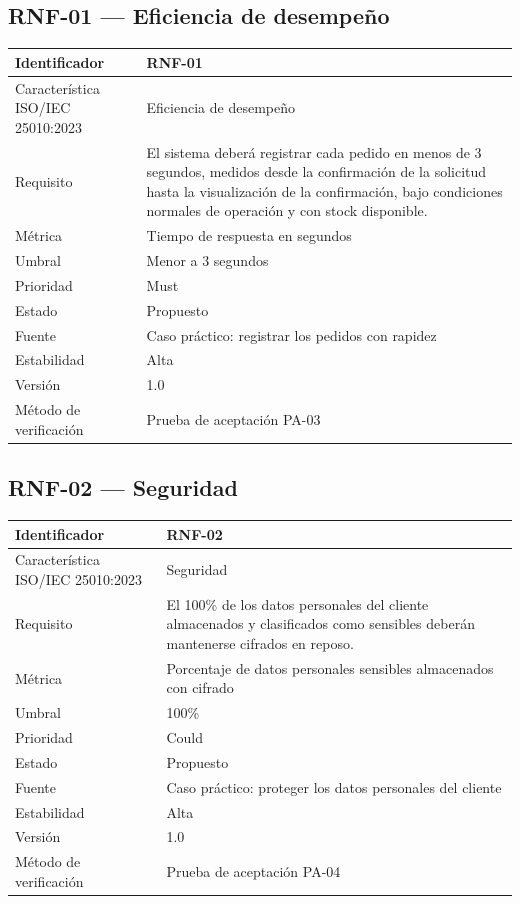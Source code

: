 \documentclass[12pt,a4paper]{article}
\begin{document}
\subsection*{RNF-01 --- Eficiencia de desempeño}
\begin{tabularx}{\textwidth}{|p{4cm}|X|}\hline
Identificador & RNF-01 \\\hline
Característica ISO/IEC 25010:2023 & Eficiencia de desempeño \\\hline
Requisito & El sistema deberá registrar cada pedido en menos de 3 segundos, medidos desde la confirmación de la solicitud hasta la visualización de la confirmación, bajo condiciones normales de operación y con stock disponible. \\\hline
Métrica & Tiempo de respuesta en segundos \\\hline
Umbral & Menor a 3 segundos \\\hline
Prioridad & Must \\\hline
Estado & Propuesto \\\hline
Fuente & Caso práctico: registrar los pedidos con rapidez \\\hline
Estabilidad & Alta \\\hline
Versión & 1.0 \\\hline
Método de verificación & Prueba de aceptación PA-03 \\\hline
\end{tabularx}

\subsection*{RNF-02 --- Seguridad}
\begin{tabularx}{\textwidth}{|p{4cm}|X|}\hline
Identificador & RNF-02 \\\hline
Característica ISO/IEC 25010:2023 & Seguridad \\\hline
Requisito & El 100\% de los datos personales del cliente almacenados y clasificados como sensibles deberán mantenerse cifrados en reposo. \\\hline
Métrica & Porcentaje de datos personales sensibles almacenados con cifrado \\\hline
Umbral & 100\% \\\hline
Prioridad & Could \\\hline
Estado & Propuesto \\\hline
Fuente & Caso práctico: proteger los datos personales del cliente \\\hline
Estabilidad & Alta \\\hline
Versión & 1.0 \\\hline
Método de verificación & Prueba de aceptación PA-04 \\\hline
\end{tabularx}
\end{document}
